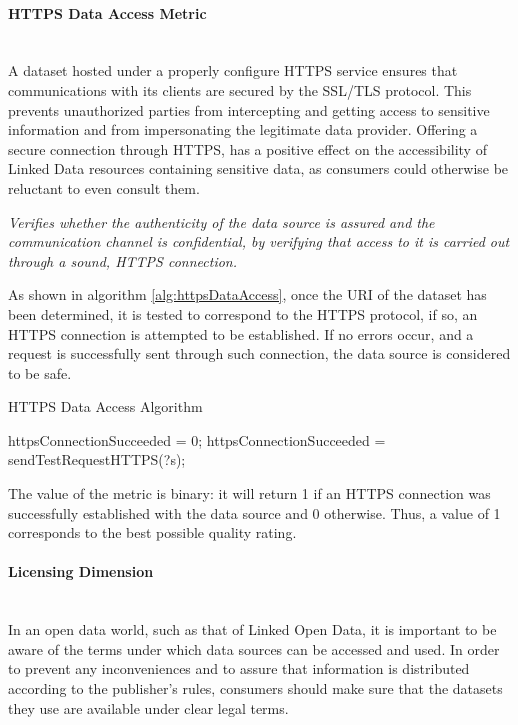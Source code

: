 \paragraph{HTTPS Data Access Metric} ~\\ %
A dataset hosted under a properly configure HTTPS service ensures that communications with its clients are secured by the SSL/TLS protocol. This prevents unauthorized parties from intercepting and getting access to sensitive information and from impersonating the legitimate data provider. Offering a secure connection through HTTPS, has a positive effect on the accessibility of Linked Data resources containing sensitive data, as consumers could otherwise be reluctant to even consult them.

\begin{mdframed}[style=metricdefinition]
\emph{Verifies whether the authenticity of the data source is assured and the communication channel is confidential, by verifying that access to it is carried out through a sound, HTTPS connection.}
\end{mdframed}

As shown in algorithm \ref{alg:httpsDataAccess}, once the URI of the dataset has been determined, it is tested to correspond to the HTTPS protocol, if so, an HTTPS connection is attempted to be established. If no errors occur, and a request is successfully sent through such connection, the data source is considered to be safe.
\begin{algorithm}
\caption{HTTPS Data Access Algorithm} \label{alg:httpsDataAccess}
\begin{algorithmic}[1]
\State httpsConnectionSucceeded = 0;
\EndProcedure
{}
\State httpsConnectionSucceeded = sendTestRequestHTTPS(?s);
\EndIf
{}
\EndProcedure
\end{algorithmic}
\end{algorithm}
The value of the metric is binary: it will return 1 if an HTTPS connection was successfully established with the data source and 0 otherwise. Thus, a value of 1 corresponds to the best possible quality rating.



\paragraph{Licensing Dimension}~\\ %
In an open data world, such as that of Linked Open Data, it is important to be aware of the terms under which data sources can be accessed and used. In order to prevent any inconveniences and to assure that information is distributed according to the publisher's rules, consumers should make sure that the datasets they use are available under clear legal terms.


